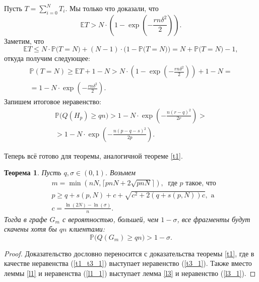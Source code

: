 \documentclass{matmex-diploma-custom}
\newcommand{\Expect}{\mathbb E}
\newcommand{\PRob}{\mathbb P}
\newcommand{\leqs}{\leqslant}
\newcommand{\geqs}{\geqslant}
\newtheorem{theorem}{Теорема}
\theoremstyle{named}
\begin{document}
Пусть $T = \sum\limits_{i = 0}^N T_i$. Мы только что доказали, что
\begin{equation}
\Expect T > N \cdot \left( 1 - \exp \left( - \frac{rn \delta^2}{2} \right) \right).
\end{equation}
Заметим, что 
\begin{equation}
\Expect T \leqs N \cdot \PRob\big(T = N\big) + (N-1) \cdot \Big(1 - \PRob\big(T = N\big)\Big) = N + \PRob\big(T = N\big) - 1,
\end{equation}
откуда получим следующее:
\begin{equation}\begin{aligned}
\PRob(T = N) \geqs \Expect T + 1 - N > N \cdot \left(1 - \exp \left( - \frac{rn \delta^2}{2} \right)\right)  + 1 - N
=
	\\
=
1 - N \cdot \exp \left( - \frac{rn \delta^2}{2} \right).
\end{aligned}\end{equation}
Запишем итоговое неравенство:
\begin{equation}\label{t3_1} \begin{aligned}
\PRob\Big(Q(H_p) \geqs qn \Big) 
	> 
1 - N \cdot \exp\left(- \frac{n (r-q)^2}{2r} \right)
	>
\\ 
	>  
1 - N \cdot \exp\left(- \frac{n (p - q - s)^2}{2p} \right). 
\end{aligned}\end{equation}

\smallskip

Теперь всё готово для теоремы, аналогичной теореме \ref{t1}.

\begin{theorem}\label{t3}
Пусть $q, \sigma \in (0, 1)$. Возьмем 
\begin{align}
& m = \min(nN, \lceil pnN + 2\sqrt{pnN} \rceil), ~ \text{ где $p$ такое, что} 
	\\
& p \geqs q + s(p, N) + c + \sqrt{c^2+2(q+s(p, N))c}, \text{ a} \label{t3_2}
	\\
& c = \frac{\ln(2N) - \ln(\sigma)}{n}.
\end{align}
Тогда в графе $G_m$ с вероятностью, большей, чем $1 - \sigma$, все фрагменты будут скачены хотя бы $qn$ клиентами:
\begin{equation}\label{t3_3}
\PRob\big(Q(G_m) \geqs qn\big) > 1 - \sigma.
\end{equation}
\end{theorem}

\begin{proof}
Доказательство дословно переносится с доказательства теоремы \ref{t1}, 
где в качестве неравенства (\ref{t1_t3_1}) выступает неравенство (\ref{t3_1}). 
Также вместо леммы \ref{l1} и неравенства (\ref{l1_1}) выступает лемма \ref{l3} и неравенство (\ref{l3_1}).
\end{proof}
\end{document}
